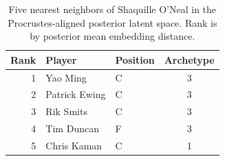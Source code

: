 \begin{table}[htbp]
  \centering\small
  \begin{tabular}{rllc}
    \toprule
    Rank & Player & Position & Archetype \\
    \midrule
    1 & Yao Ming & C & 3 \\
    2 & Patrick Ewing & C & 3 \\
    3 & Rik Smits & C & 3 \\
    4 & Tim Duncan & F & 3 \\
    5 & Chris Kaman & C & 1 \\
    \bottomrule
  \end{tabular}
  \caption{Five nearest neighbors of Shaquille O'Neal in the Procrustes-aligned posterior latent space. Rank is by posterior mean embedding distance.}
  \label{tab:Shaquille_O_Neal_neighbors}
\end{table}

